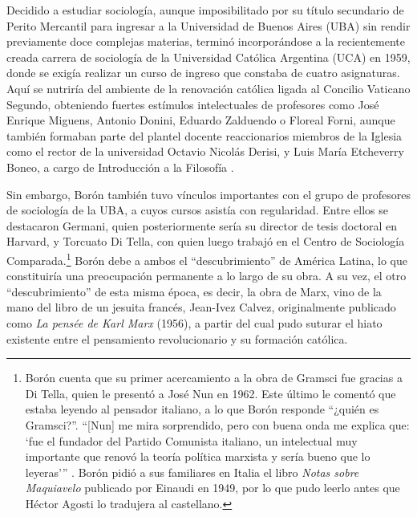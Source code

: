 Decidido a estudiar sociología, aunque imposibilitado por su título secundario de Perito Mercantil para ingresar a la Universidad de Buenos Aires (UBA) sin rendir previamente doce complejas materias, terminó incorporándose a la recientemente creada carrera de sociología de la Universidad Católica Argentina (UCA) en 1959, donde se exigía realizar un curso de ingreso que constaba de cuatro asignaturas. Aquí se nutriría del ambiente de la renovación católica ligada al Concilio Vaticano Segundo, obteniendo fuertes estímulos intelectuales de profesores como José Enrique Miguens, Antonio Donini, Eduardo Zalduendo o Floreal Forni, aunque también formaban parte del plantel docente reaccionarios miembros de la Iglesia como el rector de la universidad Octavio Nicolás Derisi, y Luis María Etcheverry Boneo, a cargo de Introducción a la Filosofía \parencite{281-ZANCA2006}.

Sin embargo, Borón también tuvo vínculos importantes con el grupo de profesores de sociología de la UBA, a cuyos cursos asistía con regularidad. Entre ellos se destacaron Germani, quien posteriormente sería su director de tesis doctoral en Harvard, y Torcuato Di Tella, con quien luego trabajó en el Centro de Sociología Comparada.\footnote{Borón cuenta que su primer acercamiento a la obra de Gramsci fue gracias a Di Tella, quien le presentó a José Nun en 1962. Este último le comentó que estaba leyendo al pensador italiano, a lo que Borón responde \enquote{¿quién es Gramsci?}. \enquote{[Nun] me mira sorprendido, pero con buena onda me explica que: \enquote{fue el fundador del Partido Comunista italiano, un intelectual muy importante que renovó la teoría política marxista y sería bueno que lo leyeras}} \parencite[114]{1444-BORON2023}. Borón pidió a sus familiares en Italia el libro \emph{Notas sobre Maquiavelo} publicado por Einaudi en 1949, por lo que pudo leerlo antes que Héctor Agosti lo tradujera al castellano.} Borón debe a ambos el \enquote{descubrimiento} de América Latina, lo que constituiría una preocupación permanente a lo largo de su obra. A su vez, el otro \enquote{descubrimiento} de esta misma época, es decir, la obra de Marx, vino de la mano del libro de un jesuita francés, Jean-Ivez Calvez, originalmente publicado como \emph{La pensée de Karl Marx} (1956), a partir del cual pudo suturar el hiato existente entre el pensamiento revolucionario y su formación católica.

